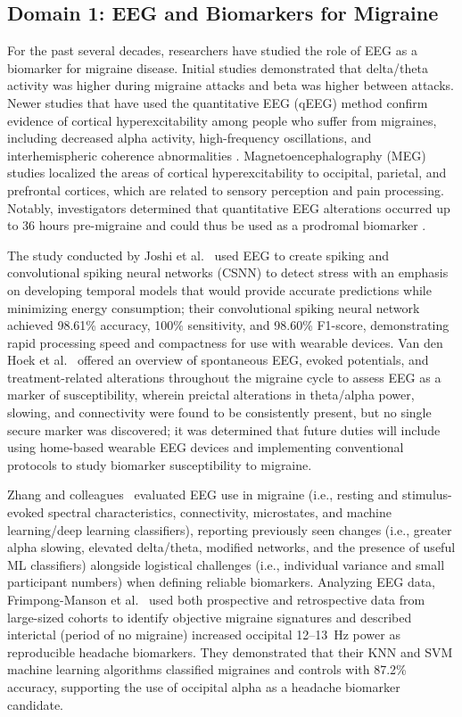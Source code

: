\documentclass[12pt, a4paper]{report}
\begin{document}
\subsection{Domain 1: EEG and Biomarkers for Migraine}
\label{subsec:lit_eeg_biomarkers}
For the past several decades, researchers have studied the role of EEG as a biomarker for migraine disease. Initial studies demonstrated that delta/theta activity was higher during migraine attacks and beta was higher between attacks. Newer studies that have used the quantitative EEG (qEEG) method confirm evidence of cortical hyperexcitability among people who suffer from migraines, including decreased alpha activity, high-frequency oscillations, and interhemispheric coherence abnormalities \cite{VanDenHoek2024}. Magnetoencephalography (MEG) studies localized the areas of cortical hyperexcitability to occipital, parietal, and prefrontal cortices, which are related to sensory perception and pain processing. Notably, investigators determined that quantitative EEG alterations occurred up to 36 hours pre-migraine and could thus be used as a prodromal biomarker \cite{Kim2023}.

The study conducted by Joshi et al.~\cite{JoshiMatharu2025} used EEG to create spiking and convolutional spiking neural networks (CSNN) to detect stress with an emphasis on developing temporal models that would provide accurate predictions while minimizing energy consumption; their convolutional spiking neural network achieved 98.61\% accuracy, 100\% sensitivity, and 98.60\% F1-score, demonstrating rapid processing speed and compactness for use with wearable devices. Van den Hoek et al.~\cite{VanDenHoek2024} offered an overview of spontaneous EEG, evoked potentials, and treatment-related alterations throughout the migraine cycle to assess EEG as a marker of susceptibility, wherein preictal alterations in theta/alpha power, slowing, and connectivity were found to be consistently present, but no single secure marker was discovered; it was determined that future duties will include using home-based wearable EEG devices and implementing conventional protocols to study biomarker susceptibility to migraine.

Zhang and colleagues~\cite{Zhang2023} evaluated EEG use in migraine (i.e., resting and stimulus-evoked spectral characteristics, connectivity, microstates, and machine learning/deep learning classifiers), reporting previously seen changes (i.e., greater alpha slowing, elevated delta/theta, modified networks, and the presence of useful ML classifiers) alongside logistical challenges (i.e., individual variance and small participant numbers) when defining reliable biomarkers. Analyzing EEG data, Frimpong-Manson et al.~\cite{FrimpongManson2024} used both prospective and retrospective data from large-sized cohorts to identify objective migraine signatures and described interictal (period of no migraine) increased occipital 12--13~Hz power as reproducible headache biomarkers. They demonstrated that their KNN and SVM machine learning algorithms classified migraines and controls with 87.2\% accuracy, supporting the use of occipital alpha as a headache biomarker candidate.
\end{document}
